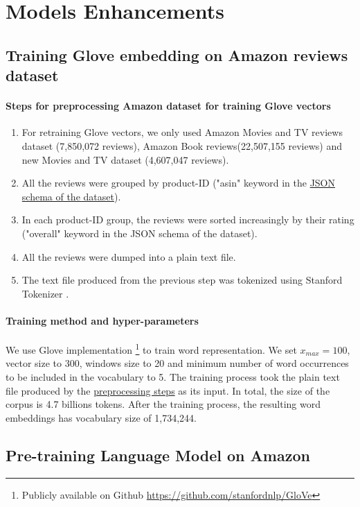\section{Models Enhancements}
\subsection{Training Glove embedding on Amazon reviews dataset}\label{sec:gloveamazone}
\paragraph{Steps for preprocessing Amazon dataset for training Glove vectors}
\label{sec:preprocessamazonglove}
\begin{enumerate}
\item For retraining Glove vectors, we only used Amazon Movies and TV reviews dataset (7,850,072 reviews)\cite{mcauley2013hidden}, Amazon Book reviews(22,507,155 reviews) and new Movies and TV dataset (4,607,047 reviews)\cite{McAuleyTSH15}\cite{HeM16}.
\item All the reviews were grouped by product-ID ("asin" keyword in the \hyperref[sec:amazon]{JSON schema of the dataset}). 
\item In each product-ID group, the reviews were sorted increasingly by their rating ("overall" keyword in the JSON schema of the dataset).
\item All the reviews were dumped into a plain text file.
\item The text file produced from the previous step was tokenized using Stanford Tokenizer \cite{tokenizerpart}. 
\end{enumerate}

\paragraph{Training method and hyper-parameters}
We use Glove implementation \footnote{Publicly available on Github \url{https://github.com/stanfordnlp/GloVe}} to train word representation. 
We set $x_{max} = 100$, vector size to 300, windows size to 20 and minimum number of word occurrences to be included in the vocabulary to  5.
The training process took the plain text file produced by the \hyperref[sec:preprocessamazonglove]{preprocessing steps} as its input. 
In total, the size of the corpus is 4.7 billions tokens. 
After the training process, the resulting word embeddings has vocabulary size of 1,734,244.

\subsection{Pre-training Language Model on Amazon}
